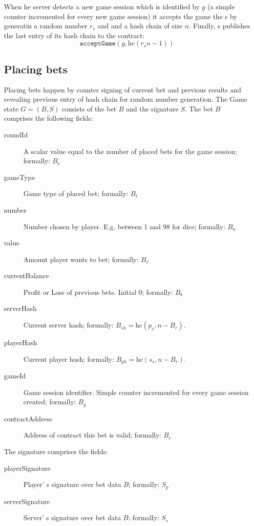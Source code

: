 \documentclass[oneside]{amsart}
\makeatletter
\newcommand*\Eg{E.g.\@\xspace}
\makeatother
\begin{document}
\begin{multicols}{2}
When he server detects a new game session which is identified by $g$ (a simple counter incremented for every new game session) it accepts
the game the  \gls{s} by generatin a random number $r_s$ and and a hash chain of size $n$.
Finally, \gls{s} publishes the last entry of its hash chain to
the contract:
\begin{equation}
    \texttt{acceptGame}(g, \text{hc}(r_s n - 1))
\end{equation}

\subsection{Placing bets}\label{subsec:placingBets}
Placing bets happen by counter signing of current bet and previous results and revealing previous entry of
hash chain for random number generation.
The Game state $G = (B, S)$ consists of the bet $B$ and the signature $S$.
The bet $B$ comprises the following fields:
\begin{description}
    \item[roundId] A scalar value equal to the number of placed bets for the game session; formally: $B_r$
    \item[gameType] Game type of placed bet; formally: $B_t$
    \item[number] Number chosen by player. \Eg between 1 and 98 for dice; formally: $B_n$
    \item[value] Amount player wants to bet; formally: $B_v$
    \item[currentBalance] Profit or Loss of previous bets. Initial 0; formally: $B_b$
    \item[serverHash] Current server hash; formally: $B_{sh} = \text{hc}(p_s, n - B_r)$.
    \item[playerHash] Current player hash; formally: $B_{ph} = \text{hc}(s_s, n - B_r)$.
    \item[gameId] Game session identifier. Simple counter incremented for every game session created; formally: $B_{g}$
    \item[contractAddress] Address of contract this bet is valid; formally: $B_{c}$
\end{description}
The signature comprises the fields:
\begin{description}
    \item[playerSignature] Player' s signature over bet data $B$; formally: $S_p$
    \item[serverSignature] Server' s signature over bet data $B$; formally: $S_s$
\end{description}


\end{multicols}
\end{document}
